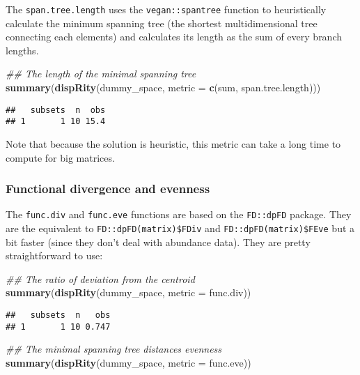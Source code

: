 \documentclass[
]{book}
\newenvironment{Shaded}{\begin{snugshade}}{\end{snugshade}}
\newcommand{\CommentTok}[1]{\textcolor[rgb]{0.56,0.35,0.01}{\textit{#1}}}
\newcommand{\DataTypeTok}[1]{\textcolor[rgb]{0.13,0.29,0.53}{#1}}
\newcommand{\KeywordTok}[1]{\textcolor[rgb]{0.13,0.29,0.53}{\textbf{#1}}}
\newcommand{\NormalTok}[1]{#1}
\begin{document}
The \texttt{span.tree.length} uses the \texttt{vegan::spantree} function to heuristically calculate the minimum spanning tree (the shortest multidimensional tree connecting each elements) and calculates its length as the sum of every branch lengths.

\begin{Shaded}
\begin{Highlighting}[]
\CommentTok{\#\# The length of the minimal spanning tree}
\KeywordTok{summary}\NormalTok{(}\KeywordTok{dispRity}\NormalTok{(dummy\_space, }\DataTypeTok{metric =} \KeywordTok{c}\NormalTok{(sum, span.tree.length)))}
\end{Highlighting}
\end{Shaded}

\begin{verbatim}
##   subsets  n  obs
## 1       1 10 15.4
\end{verbatim}

Note that because the solution is heuristic, this metric can take a long time to compute for big matrices.

\hypertarget{functional-divergence-and-evenness}{%
\subsubsection{Functional divergence and evenness}\label{functional-divergence-and-evenness}}

The \texttt{func.div} and \texttt{func.eve} functions are based on the \texttt{FD::dpFD} package.
They are the equivalent to \texttt{FD::dpFD(matrix)\$FDiv} and \texttt{FD::dpFD(matrix)\$FEve} but a bit faster (since they don't deal with abundance data).
They are pretty straightforward to use:

\begin{Shaded}
\begin{Highlighting}[]
\CommentTok{\#\# The ratio of deviation from the centroid }
\KeywordTok{summary}\NormalTok{(}\KeywordTok{dispRity}\NormalTok{(dummy\_space, }\DataTypeTok{metric =}\NormalTok{ func.div))}
\end{Highlighting}
\end{Shaded}

\begin{verbatim}
##   subsets  n   obs
## 1       1 10 0.747
\end{verbatim}

\begin{Shaded}
\begin{Highlighting}[]
\CommentTok{\#\# The minimal spanning tree distances evenness}
\KeywordTok{summary}\NormalTok{(}\KeywordTok{dispRity}\NormalTok{(dummy\_space, }\DataTypeTok{metric =}\NormalTok{ func.eve))}
\end{Highlighting}
\end{Shaded}
\end{document}
